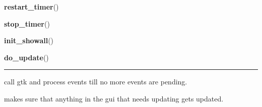     \vspace{0.5ex}

    \begin{boxedminipage}{\textwidth}

    \raggedright \textbf{restart\_timer}()

    \end{boxedminipage}

    \label{pyshowall:pyshowall:stop_timer}

    \vspace{0.5ex}

    \begin{boxedminipage}{\textwidth}

    \raggedright \textbf{stop\_timer}()

    \end{boxedminipage}

    \label{pyshowall:pyshowall:init_showall}

    \vspace{0.5ex}

    \begin{boxedminipage}{\textwidth}

    \raggedright \textbf{init\_showall}()

    \end{boxedminipage}

    \label{pyshowall:pyshowall:do_update}

    \vspace{0.5ex}

    \begin{boxedminipage}{\textwidth}

    \raggedright \textbf{do\_update}()

    \vspace{-1.5ex}

    \rule{\textwidth}{0.5\fboxrule}
    call gtk and process events till no more events are pending.

    makes sure that anything in the gui that needs updating gets updated.

    \vspace{1ex}

    \end{boxedminipage}


